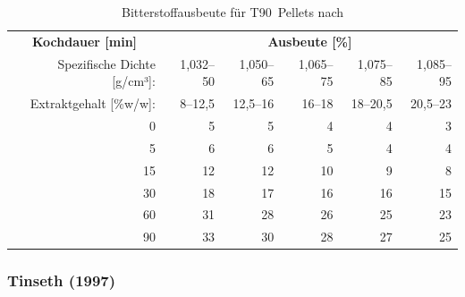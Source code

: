 \documentclass[a4paper,parskip=half]{scrartcl}
\begin{document}
\begin{table}[H]
\centering
\begin{tabular}{rrrrrr} 
\toprule
\multicolumn{1}{c}{\textbf{Kochdauer [min]}} & \multicolumn{5}{c}{\textbf{Ausbeute [\%]}}                                 \\
Spezifische Dichte [g/cm³]:                    & 1,032–50 & 1,050–65 & 1,065–75 & 1,075–85 & 1,085–95  \\
Extraktgehalt [\%w/w]:                    & 8–12,5 & 12,5–16 & 16–18 & 18–20,5 & 20,5–23  \\
\midrule
0                                            & 5        & 5        & 4                            & 4                            & 3                             \\
5                                            & 6        & 6        & 5                            & 4                            & 4                             \\
15                                           & 12       & 12       & 10                           & 9                            & 8                             \\
30                                           & 18       & 17       & 16                           & 16                           & 15                            \\
60                                           & 31       & 28       & 26                           & 25                           & 23                            \\
90                                           & 33       & 30       & 28                           & 27                           & 25                     \\
\bottomrule
\end{tabular}
\caption{Bitterstoffausbeute für T90~Pellets nach \citeauthor{Noonan1996} \parencite[215]{Noonan1996}}
\label{table:noonanbaktpellets}
\end{table}

\subsubsection*{Tinseth (1997)}
\end{document}
